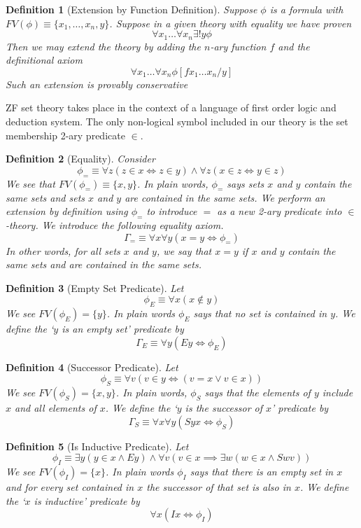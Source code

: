 \documentclass[12pt]{article}
\theoremstyle{break}
\newtheorem{definition}{Definition}[section]
\theoremstyle{break}
\theoremstyle{break}
\theoremstyle{break}
\theoremstyle{break}
\newtheorem{informal definition}[definition]{Informal Definition}
\begin{document}
\begin{definition}[Extension by Function Definition]
Suppose $\phi$ is a formula with $FV(\phi)\equiv \{x_1,\ldots, x_n, y\}$.
Suppose in a given theory with equality we have proven
$$
\forall x_1 \ldots \forall x_n \exists! y \phi
$$
Then we may extend the theory by adding the $n$-ary function $f$ and the definitional axiom
$$
\forall x_1 \ldots \forall x_n \phi[fx_1\ldots x_n/y]
$$
Such an extension is provably conservative
\end{definition}

ZF set theory takes place in the context of a language of first order logic and deduction system.
The only non-logical symbol included in our theory is the set membership 2-ary predicate $\in$.

\begin{definition}[Equality]
Consider
$$
\phi_= \equiv \forall z(z\in x \iff z \in y) \land \forall z (x\in z \iff y\in z)
$$
We see that $FV(\phi_=) \equiv \{x, y\}$.
In plain words, $\phi_=$ says sets $x$ and $y$ contain the same sets and sets $x$ and $y$ are contained in the same sets.
We perform an extension by definition using $\phi_=$ to introduce $=$ as a new 2-ary predicate into $\in$-theory.
We introduce the following equality axiom.
$$
\Gamma_= \equiv \forall x \forall y (x=y \iff \phi_=)
$$
In other words, for all sets $x$ and $y$, we say that $x=y$ if $x$ and $y$ contain the same sets and are contained in the same sets.
\end{definition}

\begin{definition}[Empty Set Predicate]
Let
$$
\phi_E \equiv \forall x (x\not\in y)
$$
We see $FV(\phi_E) = \{y\}$.
In plain words $\phi_E$ says that no set is contained in $y$.
We define the `$y$ is an empty set' predicate by
$$
\Gamma_E \equiv \forall y (Ey \iff \phi_E)
$$
\end{definition}

\begin{definition}[Successor Predicate]
Let
$$
\phi_S \equiv \forall v (v\in y \iff (v = x \lor v\in x))
$$
We see $FV(\phi_S) = \{x, y\}$.
In plain words, $\phi_S$ says that the elements of $y$ include $x$ and all elements of $x$.
We define the `$y$ is the successor of $x$' predicate by
$$
\Gamma_S \equiv \forall x \forall y (Syx \iff \phi_S)
$$
\end{definition}

\begin{definition}[Is Inductive Predicate]
Let
$$
\phi_I \equiv \exists y (y\in x \land Ey) \land \forall v(v\in x \implies \exists w (w\in x \land Swv))
$$
We see $FV(\phi_I) = \{x\}$.
In plain words $\phi_I$ says that there is an empty set in $x$ and for every set contained in $x$ the successor of that set is also in $x$.
We define the `$x$ is inductive' predicate by
$$
\forall x (Ix \iff \phi_I)
$$
\end{definition}
\end{document}
